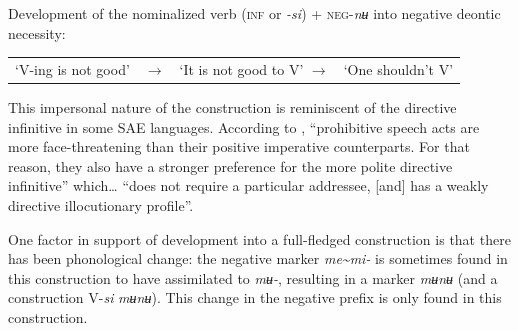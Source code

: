 \documentclass[output=paper,colorlinks,citecolor=brown,
]{langscibook}
\begin{document}

\ea \label{figure1} \textnormal{Development of the nominalized verb (\textsc{inf} or \textit{-si}) + \textsc{neg}-\textit{nʉ} into negative deontic necessity:}\\

\begin{tabular}{llll}\\[-2ex]
\textnormal{`V-ing is not good'}&
$\rightarrow$ & \textnormal{`It is not good to V'} $\rightarrow$ & \textnormal{`One shouldn't V'} \end{tabular}
\z

 This impersonal nature of the construction is reminiscent of the directive infinitive in some SAE languages. According to \citet[502]{VanOlmen2010}, ``prohibitive speech acts are more face-threatening than their positive imperative counterparts. For that reason, they also have a stronger preference for the more polite directive infinitive'' which… ``does not require a particular addressee, [and] has a weakly directive illocutionary profile''.

One factor in support of development into a full-fledged construction is that there has been phonological change: the negative marker \textit{me{\textasciitilde}mi-} is sometimes found in this construction to have assimilated to \textit{mʉ-}, resulting in a marker \textit{mʉnʉ} (and a construction V-\textit{si} \textit{mʉnʉ}). This change in the negative prefix is only found in this construction. 
\end{document}
